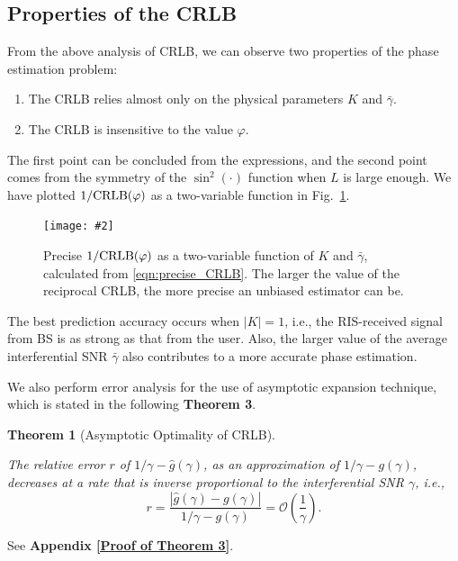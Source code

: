 \documentclass[journal,twocolumn]{IEEEtran}
\newtheorem{theorem}{\bf Theorem}
\theoremstyle{nonumberplain}
\newcommand{\myincludegraphics}[2][width=1\linewidth]{\texttt{[image: \#2]}}
\newcommand{\myincludegraphics}[2][width=0.8\linewidth]{\texttt{[image: \#2]}}
\begin{document}
\subsection{Properties of the CRLB} \label{Properties of the CRLB}
    From the above analysis of CRLB, we can observe two properties of the phase estimation problem:
    \begin{enumerate}
        \item The CRLB relies almost only on the physical parameters $K$ and $\bar{\gamma}$.
        \item The CRLB is insensitive to the value $\varphi$.
    \end{enumerate}
    The first point can be concluded from the expressions, and the second point comes from the symmetry of the $\sin^2(\cdot)$ function when $L$ is large enough. 
    We have plotted $1/{\rm CRLB}(\varphi)$ as a two-variable function in Fig.~\ref{fig:CRLB two variable}. 
    \begin{figure}[!t]
        \centering
        \myincludegraphics{data/CRLB.pdf}
        \caption{Precise $1/{\rm CRLB}(\varphi)$ as a two-variable function of $K$ and $\bar{\gamma}$, calculated from \eqref{eqn:precise_CRLB}. The larger the value of the reciprocal CRLB, the more precise an unbiased estimator can be. }
        \label{fig:CRLB two variable}
    \end{figure}
    The best prediction accuracy occurs when $\lvert K \rvert = 1$, i.e., the RIS-received signal from BS is as strong as that from the user. 
    Also, the larger value of the average interferential SNR $\bar{\gamma}$ also contributes to a more accurate phase estimation. 

We also perform error analysis for the use of asymptotic expansion technique, which is stated in the following {\bf Theorem 3}. 

    \begin{theorem}[Asymptotic Optimality of CRLB] \label{thm:CRLB_asym_error_analysis}\mbox{}\par
        The relative error $r$ of $1/\gamma - \hat{g}(\gamma)$, as an approximation of $1/\gamma - g(\gamma)$, decreases at a rate that is inverse proportional to the interferential SNR $\gamma$, i.e.,
        \begin{equation}
            r=\frac{\left|\hat{g}(\gamma)-g(\gamma)\right|}{1/\gamma - g(\gamma)} = \mathcal{O}\left(\frac{1}{\gamma}\right).
        \end{equation}
    \end{theorem}
    \begin{IEEEproof}
        See {\bf Appendix \ref{Proof of Theorem 3}}. 
    \end{IEEEproof}
\end{document}
